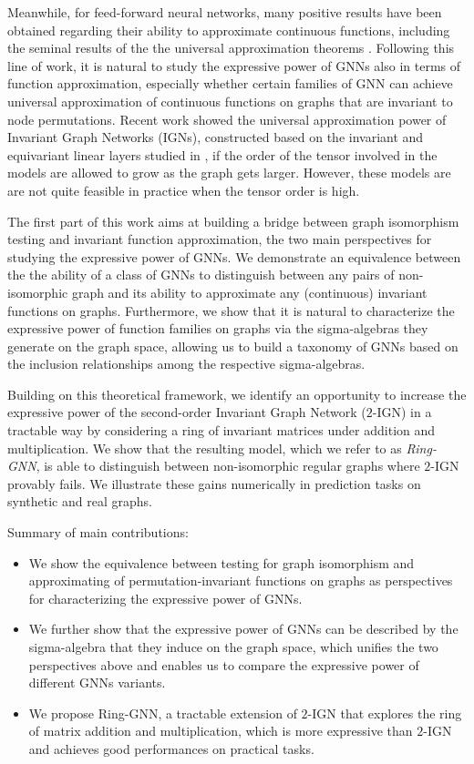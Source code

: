 \documentclass{article}
\begin{document}
Meanwhile, for feed-forward neural networks, many positive results have been obtained regarding their ability to approximate continuous functions, including the seminal results of the the universal approximation theorems \cite{cybenko1989approximation, hornik1991hornik}. Following this line of work, it is natural to study the expressive power of GNNs also in terms of function approximation, especially whether certain families of GNN can achieve universal approximation of continuous functions on graphs that are invariant to node permutations. 
Recent work \cite{maron2019universality} showed the universal approximation power of Invariant Graph Networks (IGNs), constructed based on the invariant and equivariant linear layers studied in \cite{maron2018invariant}, if the order of the tensor involved in the models are allowed to grow as the graph gets larger. 
However, these models are are not quite feasible in practice when the tensor order is high.

The first part of this work aims at building a bridge between graph isomorphism testing and invariant function approximation, the two main perspectives for studying the expressive power of GNNs. We demonstrate an equivalence between the the ability of a class of GNNs to distinguish between any pairs of non-isomorphic graph and its ability to approximate any (continuous) invariant functions on graphs. Furthermore, we show that it is natural to characterize the expressive power of function families on graphs via the sigma-algebras they generate on the graph space, allowing us to build a taxonomy of GNNs based on the inclusion relationships among the respective sigma-algebras.

Building on this theoretical framework, we identify an opportunity to increase the expressive power of the second-order Invariant Graph Network ($2$-IGN) in a tractable way by considering a ring of invariant matrices under addition and multiplication. We show that the resulting model, which we refer to as \emph{Ring-GNN}, is able to distinguish between non-isomorphic regular graphs where $2$-IGN provably fails. We illustrate these gains numerically in prediction tasks on synthetic and real graphs. 

Summary of main contributions:
\begin{itemize}
    \item We show the equivalence between testing for graph isomorphism and approximating of permutation-invariant functions on graphs as perspectives for characterizing the expressive power of GNNs.
    \item We further show that the expressive power of GNNs can be described by the sigma-algebra that they induce on the graph space, which unifies the two perspectives above and enables us to compare the expressive power of different GNNs variants.
    \item We propose Ring-GNN, a tractable extension of $2$-IGN that explores the ring of matrix addition and multiplication, which is more expressive than $2$-IGN and achieves good performances on practical tasks.
\end{itemize}
\end{document}
